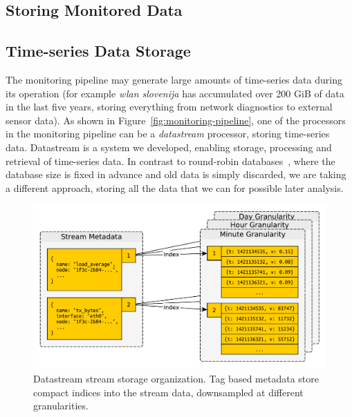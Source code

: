 \documentclass[5p,sort&compress]{elsarticle}
\newcommand{\wlanslovenija}{\textit{wlan slovenija}}
\begin{document}
\subsection{Storing Monitored Data}


\subsection{Time-series Data Storage}

The monitoring pipeline may generate large amounts of time-series data during its operation (for example \wlanslovenija{} has accumulated over 200 GiB of data in the last five years, storing everything from network diagnostics to external sensor data).
As shown in Figure~\ref{fig:monitoring-pipeline}, one of the processors in the monitoring pipeline can be a \textit{datastream} processor, storing time-series data.
Datastream is a system we developed, enabling storage, processing and retrieval of time-series data.
In contrast to round-robin databases~\cite{Oetiker_1999}, where the database size is fixed in advance and old data is simply discarded, we are taking a different approach, storing all the data that we can for possible later analysis.

\begin{figure}
  \centering
  \includegraphics[scale=0.4]{figures/datastream-storage.pdf}
  \caption{Datastream stream storage organization. Tag based metadata store compact indices into the stream data, downsampled at different granularities.}
  \label{fig:datastream-storage}
\end{figure}
\end{document}
